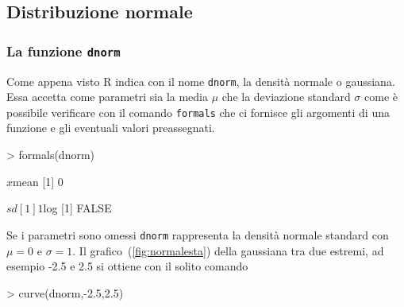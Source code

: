 \documentclass[onecolumn,12pt]{book}
\newenvironment{solution}{\textbf{Soluzione}\newline}{}
\newenvironment{answerlist}{\renewcommand{\labelenumi}{(\alph{enumi})}\begin{enumerate}}{\end{enumerate}}
\begin{document}

\subsection{Distribuzione normale}
\subsubsection{La funzione \texttt{dnorm}}
Come appena visto \textsf{R }indica con il nome \texttt{dnorm}, la densit\`a normale o gaussiana. Essa accetta come parametri sia la media $\mu$ che la deviazione standard $\sigma$ come \`e possibile verificare con il comando \texttt{formals} che ci fornisce gli argomenti di una funzione e gli eventuali valori preassegnati.
\begin{Schunk}
\begin{Sinput}
> formals(dnorm)
\end{Sinput}
\begin{Soutput}
$x


$mean
[1] 0

$sd
[1] 1

$log
[1] FALSE
\end{Soutput}
\end{Schunk}
Se i parametri sono omessi \texttt{dnorm} rappresenta la densit\`a normale standard con $\mu=0$ e $\sigma=1$.
Il grafico~(\ref{fig:normalesta}) della gaussiana
 tra due estremi, ad esempio -2.5 e 2.5 si ottiene con il solito comando
\begin{Schunk}
\begin{Sinput}
> curve(dnorm,-2.5,2.5)
\end{Sinput}
\end{Schunk}
\end{document}
